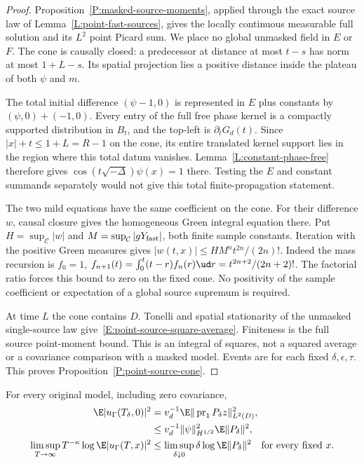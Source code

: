 \begin{proof}
  Proposition~\ref{P:masked-source-moments}, applied through the exact
  source law of Lemma~\ref{L:point-fast-sources}, gives the locally
  continuous measurable full solution and its $L^2$ point Picard sum.
  We place no global unmasked field in $E$ or $F$.
  The cone is causally closed: a predecessor at distance at most $t-s$
  has norm at most $1+L-s$.
  Its spatial projection lies a positive distance inside the plateau
  of both $\psi$ and $m$.

  The total initial difference $(\psi-1,0)$ is represented in
  $E$ plus constants by $(\psi,0)+(-1,0)$.
  Every entry of the full free phase kernel is a compactly supported
  distribution in $B_t$, and the top-left is $\partial_tG_d(t)$.
  Since $|x|+t\le1+L=R-1$ on the cone, its entire translated
  kernel support lies in the region where this total datum vanishes.
  Lemma~\ref{L:constant-phase-free} therefore gives
  $\cos(t\sqrt{-\Delta})\psi(x)=1$ there.
  Testing the $E$ and constant summands separately would not give
  this total finite-propagation statement.

  The two mild equations have the same coefficient on the cone.
  For their difference $w$, causal closure gives the homogeneous
  Green integral equation there.
  Put $H=\sup_{\mathcal C}|w|$ and
  $M=\sup_{\mathcal C}|gY_{\rm fast}|$, both finite sample constants.
  Iteration with the positive Green measures gives
  $|w(t,x)|\le HM^nt^{2n}/(2n)!$.
  Indeed the mass recursion is $f_0=1$,
  $f_{n+1}(t)=\int_0^t(t-r)f_n(r)\ud r=t^{2n+2}/(2n+2)!$.
  The factorial ratio forces this bound to zero on the fixed cone.
  No positivity of the sample coefficient or expectation of a global
  source supremum is required.

  At time $L$ the cone contains $D$.
  Tonelli and spatial stationarity of the unmasked single-source law
  give~\eqref{E:point-source-square-average}.
  Finiteness is the full source point-moment bound.
  This is an integral of squares, not a squared average or
  a covariance comparison with a masked model.
  Events are for each fixed $\delta,\epsilon,\tau$.
  This proves Proposition~\ref{P:point-source-cone}.
\end{proof}

\begin{proposition}
  \label{P:original-point-transfer}
  For every original model, including zero covariance,
  \begin{align}
    \E|u_\Gamma(T_\delta,0)|^2
    &=v_d^{-1}\E\|\operatorname{pr}_1P_\delta z\|_{L^2(D)}^2,
    \label{E:original-point-transfer}\\
    &\le v_d^{-1}\|\psi\|_{H^{1/2}}^2\E\|P_\delta\|^2,\notag\\
    \limsup_{T\to\infty}T^{-\kappa}\log\E|u_\Gamma(T,x)|^2
    &\le\limsup_{\delta\downarrow0}\delta\log\E\|P_\delta\|^2
    \quad\hbox{for every fixed }x .
    \label{E:original-point-rate-reduction}
  \end{align}
\end{proposition}

